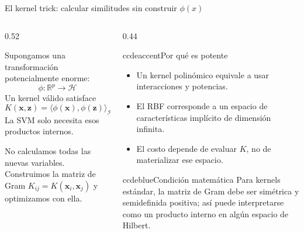 \begin{frame}{El kernel trick: calcular similitudes sin construir $\phi(x)$}
\footnotesize
\begin{columns}[T,onlytextwidth]
\begin{column}{0.52\textwidth}
\begin{ccdebox}
\centering
Supongamos una transformación potencialmente enorme:
\[
\phi:\mathbb R^p\to\mathcal H
\]
Un kernel válido satisface
\[
\boxed{K(\mathbf x,\mathbf z)=\langle \phi(\mathbf x),\phi(\mathbf z)\rangle_{\mathcal H}}
\]
La SVM solo necesita esos productos internos.
\end{ccdebox}
\vspace{0.14cm}
\begin{keybox}
No calculamos todas las nuevas variables. Construimos la matriz de Gram $K_{ij}=K(\mathbf x_i,\mathbf x_j)$ y optimizamos con ella.
\end{keybox}
\end{column}
\begin{column}{0.44\textwidth}
\begin{contrastbox}{ccdeaccent}{Por qué es potente}
\footnotesize
\begin{itemize}
  \item Un kernel polinómico equivale a usar interacciones y potencias.
  \item El RBF corresponde a un espacio de características implícito de dimensión infinita.
  \item El costo depende de evaluar $K$, no de materializar ese espacio.
\end{itemize}
\end{contrastbox}
\vspace{0.14cm}
\begin{contrastbox}{ccdeblue}{Condición matemática}
\footnotesize
Para kernels estándar, la matriz de Gram debe ser simétrica y semidefinida positiva; así puede interpretarse como un producto interno en algún espacio de Hilbert.
\end{contrastbox}
\end{column}
\end{columns}
\end{frame}

